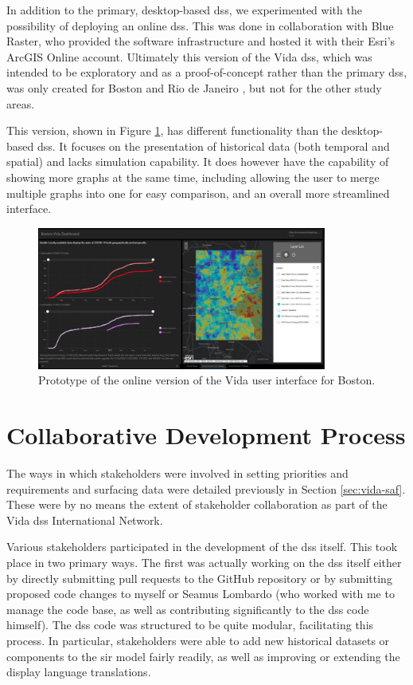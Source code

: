 In addition to the primary, desktop-based \ac{dss}, we experimented with the possibility of deploying an online \ac{dss}. This was done in collaboration with Blue Raster, who provided the software infrastructure and hosted it with their Esri's ArcGIS Online account. Ultimately this version of the Vida \ac{dss}, which was intended to be exploratory and as a proof-of-concept rather than the primary \ac{dss}, was only created for Boston \cite{bluerasterMITVidaSupportBoston2021} and Rio de Janeiro \cite{bluerasterRioJaneiroVida2021}, but not for the other study areas. 

This version, shown in Figure \ref{fig:vidab}, has different functionality than the desktop-based \ac{dss}. It focuses on the presentation of historical data (both temporal and spatial) and lacks simulation capability. It does however have the capability of showing more graphs at the same time, including allowing the user to merge multiple graphs into one for easy comparison, and an overall more streamlined interface. 

\begin{figure}[H]
\centering
\includegraphics[width=0.85\textwidth]{Figures/chap5/VidaBlueScreenshot.jpg}
\caption{Prototype of the online version of the Vida user interface for Boston.}
\label{fig:vidab}
\end{figure}

\section{Collaborative Development Process} \label{sec:vida-collab}

The ways in which stakeholders were involved in setting priorities and requirements and surfacing data were detailed previously in Section \ref{sec:vida-saf}. These were by no means the extent of stakeholder collaboration as part of the Vida \ac{dss} International Network.

Various stakeholders participated in the development of the \ac{dss} itself. This took place in two primary ways. The first was actually working on the \ac{dss} itself either by directly submitting pull requests to the GitHub repository or by submitting proposed code changes to myself or Seamus Lombardo (who worked with me to manage the code base, as well as contributing significantly to the \ac{dss} code himself). The \ac{dss} code was structured to be quite modular, facilitating this process. In particular, stakeholders were able to add new historical datasets or components to the \ac{sir} model fairly readily, as well as improving or extending the display language translations. 

